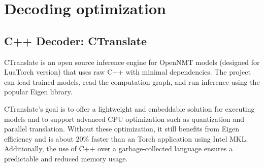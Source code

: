 \documentclass[11pt,a4paper]{article}
\begin{document}
\section{Decoding optimization}




\subsection{C++ Decoder: CTranslate}

CTranslate is an open source inference engine for OpenNMT models (designed for LuaTorch version) that uses raw C++ with minimal dependencies. The project can load trained models, read the computation graph, and run inference using the popular Eigen library.

CTranslate's goal is to offer a lightweight and embeddable solution for executing models and to support advanced CPU optimization such as quantization and parallel translation. Without these optimization, it still benefits from Eigen efficiency and is about 20\% faster than an Torch application using Intel MKL. Additionally, the use of C++ over a garbage-collected language ensures a predictable and reduced memory usage.
\end{document}

